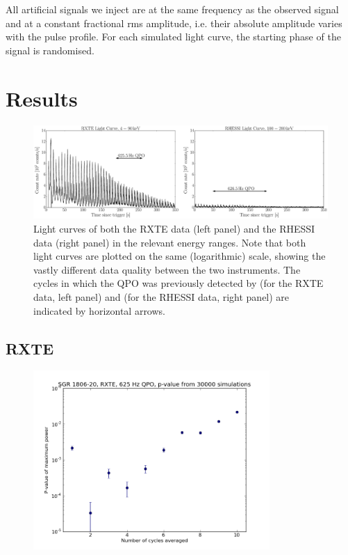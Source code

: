 \documentclass{emulateapj}
\begin{document}
All artificial signals we inject are at the same frequency as the observed signal and at a constant fractional rms amplitude, i.e. their absolute amplitude varies with the pulse profile. For each simulated light curve, the starting phase of the signal is randomised. 

\section{Results}
\label{sec:results}

\begin{figure}[htbp]
\begin{center}
\includegraphics[width=18cm]{lightcurves.eps}
\caption{Light curves of both the RXTE data (left panel) and the RHESSI data (right panel) in the relevant energy ranges. Note that both light curves are plotted on the same (logarithmic) scale, showing the vastly different data quality between the two instruments. 
The cycles in which the QPO was previously detected by \citet{Strohmayer06} (for the RXTE data, left panel) and \citet{Watts06} (for the RHESSI data, right panel) are indicated by horizontal arrows.}
\label{fig:lcs}
\end{center}
\end{figure}

\subsection{RXTE}
\label{sec:rxte_results}

\begin{figure}[htbp]
\begin{center}
\includegraphics[width=9cm]{1806_rxte_pvals.png}
\caption{}
\label{fig:rxte_pvals}
\end{center}
\end{figure}
\end{document}
